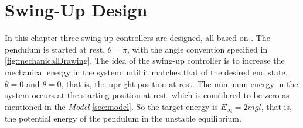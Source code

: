 %
\chapter{Swing-Up Design}\label{sec:swing-upDesign}
In this chapter three swing-up controllers are designed, all based on \cite{kjAastrom}. The pendulum is started at rest, $\theta = \pi$, with the angle convention specified in \autoref{fig:mechanicalDrawing}. The idea of the swing-up controller is to increase the mechanical energy in the system until it matches that of the desired end state, $\theta = 0$ and $\dot{\theta} = 0$, that is, the upright position at rest. The minimum energy in the system occurs at the starting position at rest, which is considered to be zero as mentioned in the \textit{Model} \autoref{sec:model}. So the target energy is $E_{\mathrm{eq}} = 2 m g l$, that is, the potential energy of the pendulum in the unstable equilibrium.

